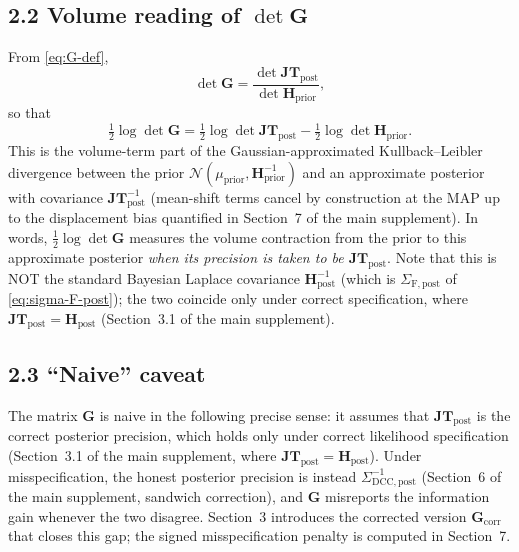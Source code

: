\documentclass[11pt]{article}
\begin{document}
\subsection*{2.2 Volume reading of $\det \mathbf G$}

From \eqref{eq:G-def},
\begin{equation}
\det \mathbf G
=
\frac{\det \mathbf{JT}_{\mathrm{post}}}{\det \mathbf H_{\mathrm{prior}}},
\label{eq:detG-ratio}
\end{equation}
so that
\begin{equation}
\tfrac{1}{2} \log \det \mathbf G
=
\tfrac{1}{2} \log \det \mathbf{JT}_{\mathrm{post}}
- \tfrac{1}{2} \log \det \mathbf H_{\mathrm{prior}}.
\label{eq:logdetG}
\end{equation}
This is the volume-term part of the Gaussian-approximated Kullback--Leibler divergence between the prior $\mathcal{N}(\mu_{\mathrm{prior}}, \mathbf H_{\mathrm{prior}}^{-1})$ and an approximate posterior with covariance $\mathbf{JT}_{\mathrm{post}}^{-1}$ (mean-shift terms cancel by construction at the MAP up to the displacement bias quantified in Section~7 of the main supplement). In words, $\tfrac{1}{2} \log \det \mathbf G$ measures the volume contraction from the prior to this approximate posterior \emph{when its precision is taken to be $\mathbf{JT}_{\mathrm{post}}$}. Note that this is NOT the standard Bayesian Laplace covariance $\mathbf H_{\mathrm{post}}^{-1}$ (which is $\Sigma_{\mathrm{F},\mathrm{post}}$ of \eqref{eq:sigma-F-post}); the two coincide only under correct specification, where $\mathbf{JT}_{\mathrm{post}} = \mathbf H_{\mathrm{post}}$ (Section~3.1 of the main supplement).

\subsection*{2.3 ``Naive'' caveat}

The matrix $\mathbf G$ is naive in the following precise sense: it assumes that $\mathbf{JT}_{\mathrm{post}}$ is the correct posterior precision, which holds only under correct likelihood specification (Section~3.1 of the main supplement, where $\mathbf{JT}_{\mathrm{post}} = \mathbf H_{\mathrm{post}}$). Under misspecification, the honest posterior precision is instead $\Sigma_{\mathrm{DCC},\mathrm{post}}^{-1}$ (Section~6 of the main supplement, sandwich correction), and $\mathbf G$ misreports the information gain whenever the two disagree. Section~3 introduces the corrected version $\mathbf G_{\mathrm{corr}}$ that closes this gap; the signed misspecification penalty is computed in Section~7.
\end{document}
